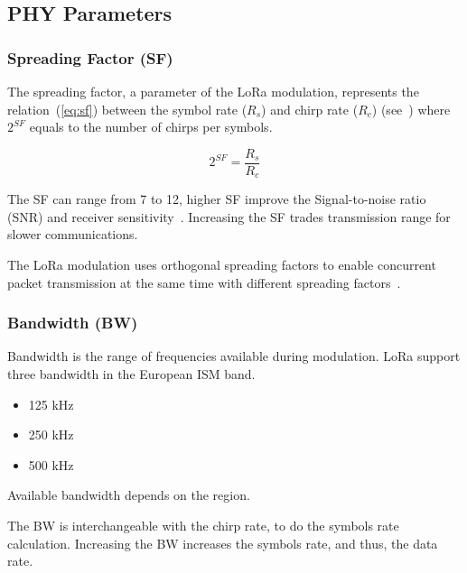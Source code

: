 \subsection{PHY Parameters}


\subsubsection{Spreading Factor (SF)}

The spreading factor, a parameter of the LoRa modulation, represents the
relation~(\ref{eq:sf}) between the symbol rate ($R_{s}$) and chirp rate ($R_{c}$)
(see~\cite{semtech:modemdesign}) where $2^{SF}$ equals to the number of chirps per
symbols.

\begin{equation}
 \label{eq:sf} 
  2^{SF} = \frac{R_s}{R_c}
\end{equation}

The SF can range from 7 to 12, higher SF improve the Signal-to-noise ratio
(SNR) and receiver sensitivity~\cite{semtech:modemdesign}.
Increasing the SF trades transmission range for slower communications.

The LoRa modulation uses orthogonal spreading factors to enable concurrent
packet transmission at the same time with different
spreading factors~\cite{semtech:modulationbasics}.

\subsubsection{Bandwidth (BW)}

Bandwidth is the range of frequencies available during modulation.
LoRa support three bandwidth in the European ISM band.

\begin{itemize}
    \item 125 kHz
    \item 250 kHz
    \item 500 kHz
\end{itemize}

Available bandwidth depends on the region. %

The BW is interchangeable with the chirp rate, to do the symbols rate
calculation.
Increasing the BW increases the symbols rate, and thus, the data rate.

